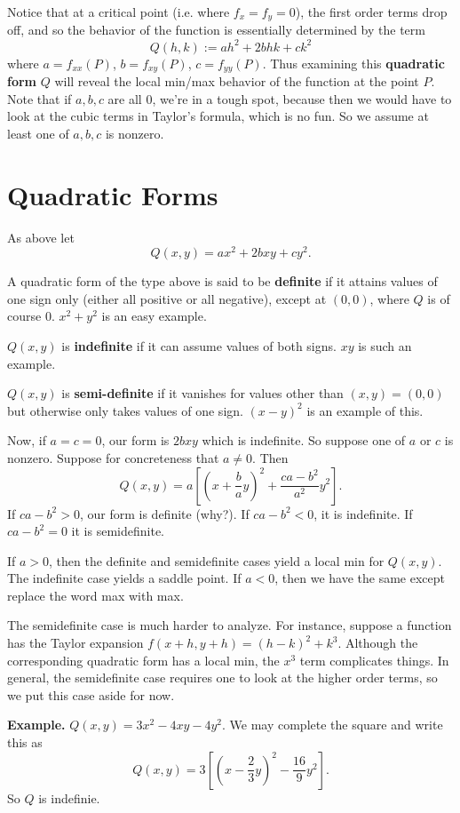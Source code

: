 \documentclass{article}
\begin{document}
Notice that at a critical point (i.e. where $f_x=f_y=0$), the 
first order terms drop off, and so the behavior of the function 
is essentially determined by the term
\[Q(h,k) := ah^2 + 2bhk + ck^2\]
where $a = f_{xx}(P)$, $b=f_{xy}(P)$, $c=f_{yy}(P)$.
Thus examining this \textbf{quadratic form} $Q$ will reveal the local min/max
behavior of the function at the point $P$. Note that if $a,b,c$ are
all $0$, we're in a tough spot, because then we would have to look at the
cubic terms in Taylor's formula, which is no fun. So we assume at 
least one of $a,b,c$ is nonzero.




\section*{Quadratic Forms}

As above let 
\[Q(x,y) = ax^2 + 2bxy + cy^2.\]

A quadratic form of the type above is said to be \textbf{definite} if 
it attains values of one sign only (either all positive or all negative), 
except at $(0,0)$, where $Q$ is of course $0$. $x^2 + y^2$ is an easy example.

$Q(x,y)$ is \textbf{indefinite} if it can assume values of both signs. 
$xy$ is such an example.

$Q(x,y)$ is \textbf{semi-definite} if it vanishes for values other 
than $(x,y)=(0,0)$ but otherwise only takes values of one sign. 
$(x-y)^2$ is an example of this.

Now, if $a=c=0$, our form is $2bxy$ which is indefinite. 
So suppose one of $a$ or $c$ is nonzero. Suppose for concreteness
that $a \neq 0$. Then 
\[Q(x,y) = a \left[ {\left( x + \frac{b}{a}y \right)}^2 +\frac{ca-b^2}{a^2}y^2\right].\]
If $ca-b^2>0$, our form is definite (why?). If $ca-b^2 < 0$, it is indefinite.
If $ca-b^2=0$ it is semidefinite.

If $a>0$, then the definite and semidefinite cases yield a local min
for $Q(x,y)$. The indefinite case yields a saddle point. If $a<0$, then
we have the same except replace the word max with max.

The semidefinite case is much harder to analyze. For instance, suppose a function
has the Taylor expansion $f(x+h,y+h)= (h-k)^2 + k^3$. Although the corresponding
quadratic form has a local min, the $x^3$ term complicates things. In general,
the semidefinite case requires one to look at the higher order terms, so we put this case aside
for now.

\textbf{Example.} $Q(x,y) = 3x^2 - 4xy - 4y^2$. 
We may complete the square and write this as 
\[Q(x,y) = 3 \left[ \left( x - \frac{2}{3}y \right)^2 - \frac{16}{9}y^2 \right].\]
So $Q$ is indefinie.
\end{document}
